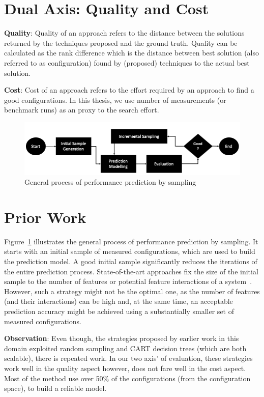 \section{Dual Axis: Quality and Cost}
\noindent\textbf{Quality}: Quality of an approach refers to the distance between the solutions returned by the techniques proposed and the ground truth. Quality can be calculated as the rank difference which is the distance between best solution (also referred to as configuration) found by (proposed) techniques to the actual best solution.

\noindent\textbf{Cost}: Cost of an approach refers to the effort required by an approach to find a good configurations. In this thesis, we use number of measurements (or benchmark runs) as an proxy to the search effort.

\begin{figure}[!htbp]
    \centering
    \includegraphics[width=0.8\linewidth]{Chapter-Introduction/Figures/sampling_process.png}
    \caption{ General process of performance prediction by sampling}
    \label{fig:chap1_sampling_process}
\end{figure}

\section{Prior Work}
Figure~\ref{fig:chap1_sampling_process} illustrates the general process of performance prediction by sampling. It starts with
an initial sample of measured configurations, which are used to build the prediction model. A
good initial sample significantly reduces the iterations of the entire prediction process. State-of-the-art
approaches fix the size of the initial sample to the number of features or potential feature
interactions of a system~\cite{siegmund2012predicting, guo2013variability}. However, such a strategy might not be the optimal one, as the
number of features (and their interactions) can be high and, at the same time, an acceptable prediction
accuracy might be achieved using a substantially smaller set of measured configurations.

\noindent\textbf{Observation}: Even though, the strategies proposed by earlier work in this domain exploited random sampling and CART decision trees (which are both scalable), there is repeated work. In our two axis' of evaluation, these strategies work well in the quality aspect however, does not fare well in the cost aspect. Most of the method use over 50\% of the configurations (from the configuration space), to build a reliable model. 

